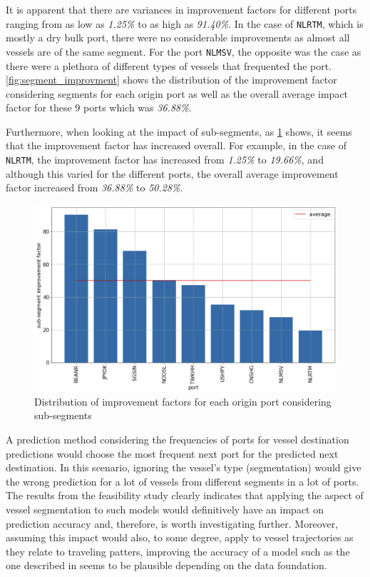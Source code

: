 It is apparent that there are variances in improvement factors for different ports ranging from as low as \textit{1.25\%} to as high as \textit{91.40\%}. In the case of \texttt{NLRTM}, which is mostly a dry bulk port, there were no considerable improvements as almost all vessels are of the same segment. For the port \texttt{NLMSV}, the opposite was the case as there were a plethora of different types of vessels that frequented the port. \cref{fig:segment_improvment} shows the distribution of the improvement factor considering segments for each origin port as well as the overall average impact factor for these 9 ports which was \textit{36.88\%}.

Furthermore, when looking at the impact of sub-segments, as \cref{fig:subsegment_improvment} shows, it seems that the improvement factor has increased overall. For example, in the case of \texttt{NLRTM}, the improvement factor has increased from \textit{1.25\%} to \textit{19.66\%}, and although this varied for the different ports, the overall average improvement factor increased from \textit{36.88\%} to \textit{50.28\%}.

\begin{figure}[htbp]
    \centering
    \includegraphics[width=.9\textwidth]{figures/apw/subsegment_improvement.png}
    \caption{Distribution of improvement factors for each origin port considering sub-segments}
    \label{fig:subsegment_improvment}
\end{figure}

A prediction method considering the frequencies of ports for vessel destination predictions would choose the most frequent next port for the predicted next destination. In this scenario, ignoring the vessel's type (segmentation) would give the wrong prediction for a lot of vessels from different segments in a lot of ports. The results from the feasibility study clearly indicates that applying the aspect of vessel segmentation to such models would definitively have an impact on prediction accuracy and, therefore, is worth investigating further. Moreover, assuming this impact would also, to some degree, apply to vessel trajectories as they relate to traveling patters, improving the accuracy of a model such as the one described in \cite{ZHANG2020102729} seems to be plausible depending on the data foundation.